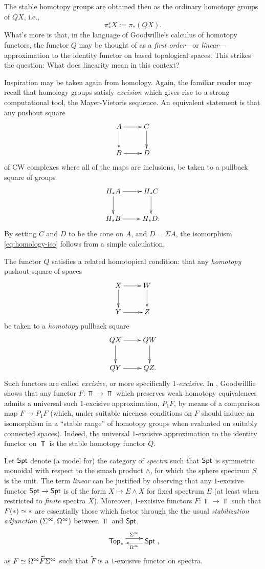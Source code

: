 The stable homotopy groups are obtained then as the ordinary homotopy groups of $QX$, i.e., \[\pi_*^sX:= \pi_*(QX).\] What's more is that, in the language of Goodwillie's calculus of homotopy functors, the functor $Q$ may be thought of as a \textit{first order}---or \textit{linear}---approximation to the identity functor on based topological spaces. This strikes the question: What does linearity mean in this context?

Inspiration may be taken again from homology. Again, the familiar reader may recall that homology groups satisfy \textit{excision} which gives rise to a strong computational tool, the Mayer-Vietoris sequence. An equivalent statement is that any pushout square \[ \xymatrix{A \ar[r] \ar[d] & C \ar[d] \\ B \ar[r] & D }\] of CW complexes where all of the maps are inclusions, be taken to a pullback square of groups \[ \xymatrix{H_* A \ar[r] \ar[d] & H_* C \ar[d] \\ H_* B \ar[r] & H_* D. }\] By setting $C$ and $D$ to be the cone on $A$, and $D=\Sigma A$, the isomorphism \eqref{eq:homology-iso} follows from a simple calculation. 

The functor $Q$ satisfies a related homotopical condition: that any \textit{homotopy} pushout square of spaces \[ \xymatrix{X \ar[r] \ar[d] & W \ar[d] \\ Y \ar[r] & Z }\] be taken to a \textit{homotopy} pullback square \[ \xymatrix{QX \ar[r] \ar[d] & QW \ar[d] \\ QY \ar[r] & QZ. }\] Such functors are called \textit{excisive}, or more specifically \textit{$1$-excisive}. In \cite{Goo-Calc3}, Goodwilllie shows that any functor $F\colon \Top\to \Top$ which preserves weak homotopy equivalences admits a universal such $1$-excisive approximation, $P_1F$, by means of a comparison map $F\to P_1F$ (which, under suitable niceness conditions on $F$ should induce an isomorphism in a ``stable range'' of homotopy groups when evaluated on suitably connected spaces). Indeed, the universal $1$-excisive approximation to the identity functor on $\Top$ is the stable homotopy functor $Q$. 

Let $\mathsf{Spt}$ denote (a model for) the category of \textit{spectra} such that $\mathsf{Spt}$ is symmetric monoidal with respect to the smash product $\wedge$, for which the sphere spectrum $S$ is the unit. The term \textit{linear} can be justified by observing that any $1$-excisive functor $\mathsf{Spt}\to \mathsf{Spt}$ is of the form $X\mapsto E\wedge X$ for fixed spectrum $E$ (at least when restricted to \textit{finite} spectra $X$). Moreover, $1$-excisive functors $F\colon \Top\to \Top$ such that $F(*)\simeq *$ are essentially those which factor through the the usual \textit{stabilization adjunction} $(\Sigma^{\infty}, \Omega^{\infty})$ between $\Top$ and $\mathsf{Spt}$, \[ \xymatrix{\Top \ar@<1ex>[r]^-{\Sp} & \Spt \ar@<.5ex>[l]^-{\U}}, \] as $F\simeq \Omega^{\infty} \widetilde{F} \Sigma^{\infty}$ such that $\widetilde{F}$ is a $1$-excisive functor on spectra. 

